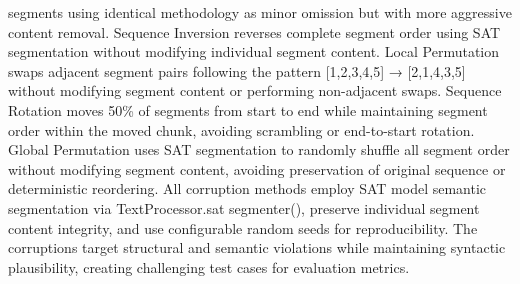 \documentclass[main.tex]{subfiles}
\begin{document}
segments using identical methodology as minor omission but with more aggressive content removal. Sequence Inversion reverses complete segment order using SAT segmentation without modifying individual segment content. Local Permutation swaps adjacent segment pairs following the pattern [1,2,3,4,5] → [2,1,4,3,5] without modifying segment content or performing non-adjacent swaps. Sequence Rotation moves 50\% of segments from start to end while maintaining segment order within the moved chunk, avoiding scrambling or end-to-start rotation. Global Permutation uses SAT segmentation to randomly shuffle all segment order without modifying segment content, avoiding preservation of original sequence or deterministic reordering. All corruption methods employ SAT model semantic segmentation via TextProcessor.sat segmenter(), preserve individual segment content integrity, and use configurable random seeds for reproducibility. The corruptions target structural and semantic violations while maintaining syntactic plausibility, creating challenging test cases for evaluation metrics.
\end{document}
